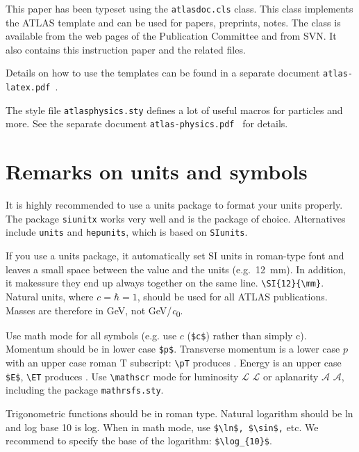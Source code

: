 \documentclass[coverpage]{style/atlasdoc}
\begin{document}
This paper has been typeset using the \texttt{atlasdoc.cls} class.
This class implements the ATLAS template and can be used for papers, preprints,
notes. The class is available from the web pages of the
Publication Committee and from SVN.
It also contains this instruction paper and the related files.

Details on how to use the templates can be found in a separate document
\texttt{atlas-latex.pdf}~\cite{atlas-latex}.

The style file \texttt{atlasphysics.sty} defines a lot of useful
macros for particles and more. See the separate document
\texttt{atlas-physics.pdf}~\cite{atlas-physics} for details.


\section{Remarks on units and symbols}

It is highly recommended to use a units package to format your units properly.
The package \texttt{siunitx} works very well and is the package of choice.
Alternatives include \texttt{units} and \texttt{hepunits},
which is based on \texttt{SIunits}.

If you use a units package, it automatically set SI units in roman-type font
and leaves a small space between
the value and the units (e.g.\ \SI{12}{\mm}). 
In addition, it makessure they end up
always together on the same line. \verb|\SI{12}{\mm}|.
Natural units, where $c=\hbar=1$, should be used for all
ATLAS publications. Masses are therefore in \si{\GeV}, not \si[per-mode=symbol]{\GeV\per\clight}.

Use math mode for all symbols (e.g. use $c$ (\verb|$c$|) rather than simply c). 
Momentum should be in lower case \verb+$p$+. 
Transverse momentum is a lower case $p$ with an upper case roman $\text{T}$ subscript: 
\verb|\pT| produces \pT.
Energy is an upper case \verb+$E$+, \verb+\ET+ produces \ET.  
Use \verb|\mathscr| mode for luminosity $\mathscr{L}$ $\mathcal{L}$ or aplanarity
$\mathscr{A}$ $\mathcal{A}$, including the package \verb|mathrsfs.sty|.

Trigonometric functions should be in roman type. Natural logarithm
should be ln and log base 10 is log.  When in math mode, use
\verb+$\ln$, $\sin$,+ etc. We recommend to specify the base of the
logarithm: \verb+$\log_{10}$+.
\end{document}
